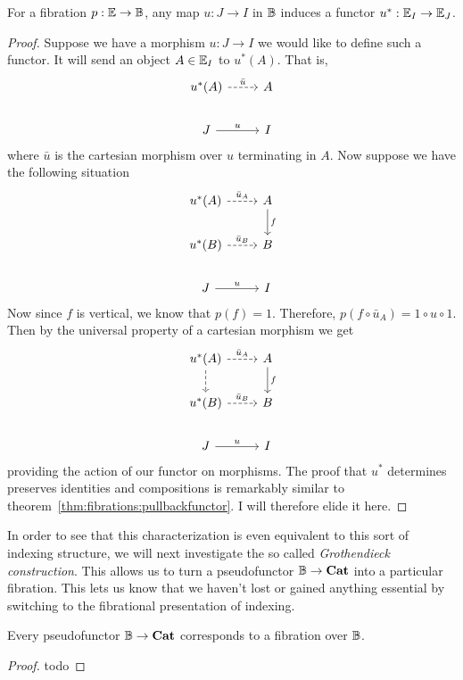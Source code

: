 \begin{thm}\label{thm:fibrations:reindexing}
  For a fibration $p : \mathbb{E} \to \mathbb{B}$, any map $u : J \to I$ in
  $\mathbb{B}$ induces a functor $u^* : \mathbb{E}_I \to \mathbb{E}_J$.
\end{thm}
\begin{proof}
  Suppose we have a morphism $u : J \to I$ we would like to define
  such a functor. It will send an object $A \in \mathbb{E}_I$ to
  $u^*(A)$. That is,
  \[
    \begin{tikzcd}
      u^*(A) \ar[r, dashed, "\bar{u}"] & A\\
      J \ar[r, "u"] & I
    \end{tikzcd}
  \]
  where $\bar{u}$ is the cartesian morphism over $u$ terminating in
  $A$. Now suppose we have the following situation
  \[
    \begin{tikzcd}
      u^*(A) \ar[r, dashed, "\bar{u}_A"] & A \ar[d, "f"]\\
      u^*(B) \ar[r, dashed, "\bar{u}_B"] & B\\
      J \ar[r, "u"] & I
    \end{tikzcd}
  \]
  Now since $f$ is vertical, we know that $p(f) = 1$. Therefore,
  $p(f \circ \bar{u}_A) = 1 \circ u \circ 1$. Then by the universal
  property of a cartesian morphism we get
  \[
    \begin{tikzcd}
      u^*(A) \ar[d, dashed] \ar[r, dashed, "\bar{u}_A"] & A \ar[d, "f"]\\
      u^*(B) \ar[r, dashed, "\bar{u}_B"] & B\\
      J \ar[r, "u"] & I
    \end{tikzcd}
  \]
  providing the action of our functor on morphisms. The proof that
  $u^*$ determines preserves identities and compositions is remarkably
  similar to theorem~\ref{thm:fibrations:pullbackfunctor}. I will
  therefore elide it here.
\end{proof}

In order to see that this characterization is even equivalent to this
sort of indexing structure, we will next investigate the so called
\emph{Grothendieck construction}. This allows us to turn a
pseudofunctor $\mathbb{B} \to \mathbf{Cat}$ into a particular fibration. This
lets us know that we haven't lost or gained anything essential by
switching to the fibrational presentation of indexing.

\begin{thm}\label{thm:fibrations:grothendieckconstruction}
  Every pseudofunctor $\mathbb{B} \to \mathbf{Cat}$ corresponds to a fibration
  over $\mathbb{B}$.
\end{thm}
\begin{proof}
  todo
\end{proof}


